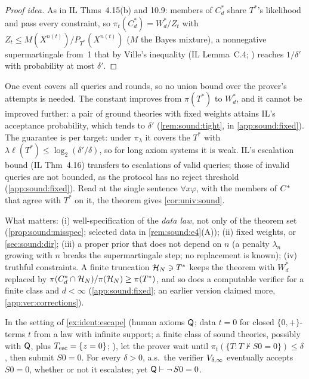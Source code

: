 \begin{proof}[Proof idea]
As in IL Thms~4.15(b) and 10.9: members of $C^*_d$ share $T^*$'s likelihood and pass every constraint, so $\pi_t(C^*_d)=W^*_d/Z_t$ with $Z_t\le M(X^{n(t)})/P_{T^*}(X^{n(t)})$ ($M$ the Bayes mixture), a nonnegative supermartingale from~1 that by Ville's inequality (IL Lemma~C.4; \citealp{ville1939etude}) reaches $1/\delta'$ with probability at most $\delta'$.
\end{proof}

One event covers all queries and rounds, so no union bound over the prover's attempts is needed. The constant improves from $\pi(T^*)$ to $W^*_d$, and it cannot be improved further: a pair of ground theories with fixed weights attains IL's acceptance probability, which tends to $\delta'$ (\cref{rem:sound:tight}, in \cref{app:sound:fixed}). The guarantee is per target: under $\pi_\lambda$ it covers the $T^*$ with $\lambda\ell(T^*)\le\log_2(\delta'/\delta)$, so for long axiom systems it is weak. IL's escalation bound (IL Thm~4.16) transfers to escalations of valid queries; those of invalid queries are not bounded, as the protocol has no reject threshold (\cref{app:sound:fixed}). Read at the single sentence $\forall x\varphi$, with the members of $C^{*}$ that agree with $T^*$ on it, the theorem gives \cref{cor:univ:sound}.

\begin{remark}[Hypotheses]\label{rem:sound:hyp}
What matters: (i) well-specification of the \emph{data law}, not only of the theorem set (\cref{prop:sound:misspec}; selected data in \cref{rem:sound:e4}(A)); (ii) fixed weights, or \cref{sec:sound:dir}; (iii) a proper prior that does not depend on $n$ (a penalty $\lambda_n$ growing with $n$ breaks the supermartingale step; no replacement is known); (iv) truthful constraints. A finite truncation $\mathcal{H}_N\ni T^*$ keeps the theorem with $W^*_d$ replaced by $\pi(C^*_d\cap\mathcal{H}_N)/\pi(\mathcal{H}_N)\ge\pi(T^*)$, and so does a computable verifier for a finite class and $d<\infty$ (\cref{app:sound:fixed}; an earlier version claimed more, \cref{app:ver:corrections}).
\end{remark}

\begin{proposition}\label{prop:sound:misspec}
In the setting of \cref{ex:ident:escape} (human axioms $\mathsf{Q}$; data $t=0$ for closed $\{0,+\}$-terms $t$ from a law with infinite support; a finite class of sound theories, possibly with $\mathsf{Q}$, plus $T_{\mathrm{esc}}=\{z=0\}$; \Lzero), let the prover wait until $\pi_t(\{T:T\nvdash S0=0\})\le\delta$, then submit $S0=0$. For every $\delta>0$, a.s.\ the verifier $V_{\delta,\infty}$ eventually accepts $S0=0$, whether or not it escalates; yet $\mathsf{Q}\vdash\neg\,S0=0$.
\end{proposition}

